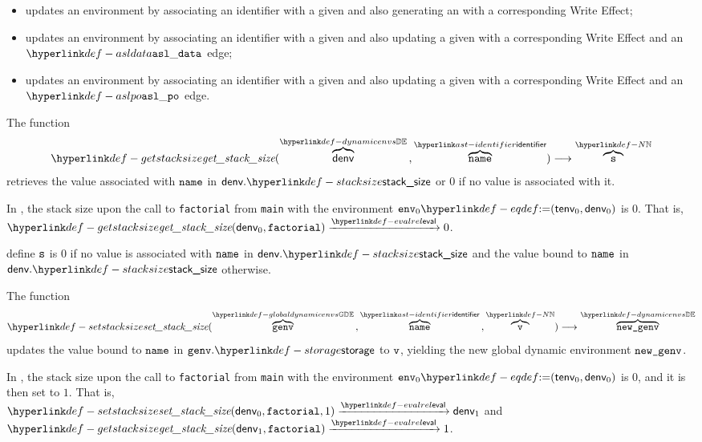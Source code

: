 \begin{itemize}
  \item {} updates an environment by associating an identifier with a given \nativevalue{}
        and also generating an \executiongraph{} with a corresponding Write Effect;
  \item {} updates an environment by associating an identifier with a given \nativevalue{}
        and also updating a given \executiongraph{} with a corresponding Write Effect and an $\asldata$ edge;
  \item {} updates an environment by associating an identifier with a given \nativevalue{}
        and also updating a given \executiongraph{} with a corresponding Write Effect and an $\aslpo$ edge.
\end{itemize}

\hypertarget{def-getstacksize}{}
The function
\[
\getstacksize(\overname{\denv}{\dynamicenvs} \aslsep \overname{\name}{\identifier}) \aslto \overname{\vs}{\N}
\]
retrieves the value associated with $\name$ in $\denv.\stacksize$ or $0$ if no value is associated with it.

In , the stack size upon the call to \verb|factorial| from \verb|main|
with the environment $\env_0 \eqdef (\tenv_0, \denv_0)$ is $0$.
That is, $\getstacksize(\denv_0, \factorial) \evalarrow 0$.

\ProseParagraph
define $\vs$ is $0$ if no value is associated with $\name$ in $\denv.\stacksize$ and the value bound to
$\name$ in $\denv.\stacksize$ otherwise.

\FormallyParagraph
\begin{mathpar}
\end{mathpar}

\hypertarget{def-setstacksize}{}
The function
\[
\setstacksize(\overname{\genv}{\globaldynamicenvs} \aslsep \overname{\name}{\identifier} \aslsep \overname{\vv}{\N}) \aslto
\overname{\newgenv}{\dynamicenvs}
\]
updates the value bound to $\name$ in $\genv.\storage$ to $\vv$, yielding the new global dynamic environment $\newgenv$.

In , the stack size upon the call to \verb|factorial| from \verb|main|
with the environment $\env_0 \eqdef (\tenv_0, \denv_0)$ is $0$, and it is then set to $1$.
That is, \\
$\setstacksize(\denv_0, \factorial, 1) \evalarrow \denv_1$
and\\
$\getstacksize(\denv_1, \factorial) \evalarrow 1$.

